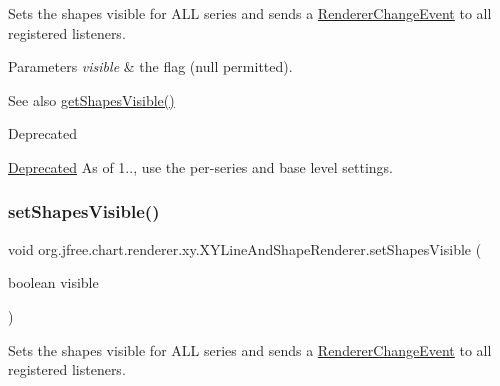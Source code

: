 Sets the \textquotesingle{}shapes visible\textquotesingle{} for A\+LL series and sends a \mbox{\hyperlink{}{Renderer\+Change\+Event}} to all registered listeners.


\begin{DoxyParams}{Parameters}
{\em visible} & the flag ({\ttfamily null} permitted).\\
\hline
\end{DoxyParams}
\begin{DoxySeeAlso}{See also}
\mbox{\hyperlink{classorg_1_1jfree_1_1chart_1_1renderer_1_1xy_1_1_x_y_line_and_shape_renderer_a25d79c5f041107df31533fbc2b9f6d62}{get\+Shapes\+Visible()}}
\end{DoxySeeAlso}
\begin{DoxyRefDesc}{Deprecated}
\item[\mbox{\hyperlink{deprecated__deprecated000246}{Deprecated}}]As of 1.., use the per-\/series and base level settings. \end{DoxyRefDesc}
\mbox{\label{classorg_1_1jfree_1_1chart_1_1renderer_1_1xy_1_1_x_y_line_and_shape_renderer_af3312da79ca25e4f2e19c65a298b8874}} 
\subsubsection{\texorpdfstring{set\+Shapes\+Visible()}{setShapesVisible()}\hspace{0.1cm}{\footnotesize\ttfamily [2/2]}}
{\footnotesize\ttfamily void org.\+jfree.\+chart.\+renderer.\+xy.\+X\+Y\+Line\+And\+Shape\+Renderer.\+set\+Shapes\+Visible (\begin{DoxyParamCaption}\item[{boolean}]{visible }\end{DoxyParamCaption})}

Sets the \textquotesingle{}shapes visible\textquotesingle{} for A\+LL series and sends a \mbox{\hyperlink{}{Renderer\+Change\+Event}} to all registered listeners.


